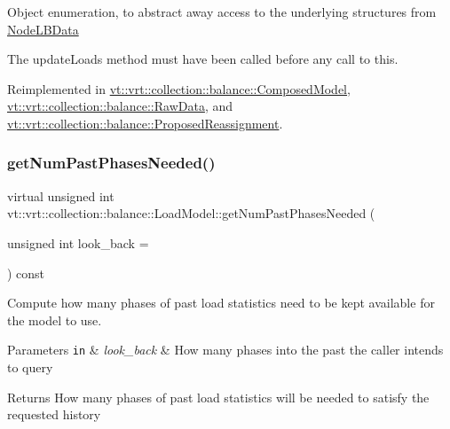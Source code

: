 Object enumeration, to abstract away access to the underlying structures from \hyperlink{structvt_1_1vrt_1_1collection_1_1balance_1_1_node_l_b_data}{Node\+L\+B\+Data}

The {\ttfamily update\+Loads} method must have been called before any call to this. 

Reimplemented in \hyperlink{classvt_1_1vrt_1_1collection_1_1balance_1_1_composed_model_abd58ffd308443021356aff2595c6980f}{vt\+::vrt\+::collection\+::balance\+::\+Composed\+Model}, \hyperlink{structvt_1_1vrt_1_1collection_1_1balance_1_1_raw_data_af52829981fa8aec26ac5cfc0a2d29cce}{vt\+::vrt\+::collection\+::balance\+::\+Raw\+Data}, and \hyperlink{structvt_1_1vrt_1_1collection_1_1balance_1_1_proposed_reassignment_a7134943ece9dc9a0d4539536f60eed6e}{vt\+::vrt\+::collection\+::balance\+::\+Proposed\+Reassignment}.

\mbox{\label{structvt_1_1vrt_1_1collection_1_1balance_1_1_load_model_a44905eb3e15e7f22b2f8d1fe7297cea0}} 
\subsubsection{\texorpdfstring{get\+Num\+Past\+Phases\+Needed()}{getNumPastPhasesNeeded()}}
{\footnotesize\ttfamily virtual unsigned int vt\+::vrt\+::collection\+::balance\+::\+Load\+Model\+::get\+Num\+Past\+Phases\+Needed (\begin{DoxyParamCaption}\item[{unsigned int}]{look\+\_\+back = {} }\end{DoxyParamCaption}) const\hspace{0.3cm}{\ttfamily [pure virtual]}}



Compute how many phases of past load statistics need to be kept available for the model to use. 


\begin{DoxyParams}[1]{Parameters}
\mbox{\tt in}  & {\em look\+\_\+back} & How many phases into the past the caller intends to query\\
\hline
\end{DoxyParams}
\begin{DoxyReturn}{Returns}
How many phases of past load statistics will be needed to satisfy the requested history 
\end{DoxyReturn}


